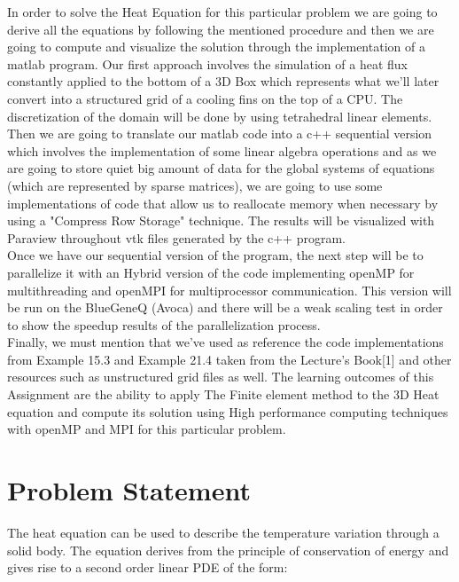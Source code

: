 \documentclass[12pt]{article}
\begin{document}
In order to solve the Heat Equation for this particular problem we are going to derive all the equations by following the mentioned procedure and then we are going to compute and visualize the solution through the implementation of a matlab program. Our first approach involves the simulation of a heat flux constantly applied to the bottom of a 3D Box which represents what we'll later convert into a structured grid of a cooling fins on the top of a CPU. The discretization of the domain will be done by using tetrahedral linear elements. \\

Then we are going to translate our matlab code into a c++ sequential version which involves the implementation of some linear algebra operations and as we are going to store quiet big amount of data for the global systems of equations (which are represented by sparse matrices), we are going to use some implementations of code that allow us to reallocate memory when necessary by using a "Compress Row Storage" technique. The results will be visualized with Paraview throughout vtk files generated by the c++ program.\\

Once we have our sequential version of the program, the next step will be to parallelize it with an Hybrid version of the code implementing openMP for multithreading and openMPI for multiprocessor communication. This version will be run on the BlueGeneQ (Avoca) and there will be a weak scaling test in order to show the speedup results of the parallelization process.\\

Finally, we must mention that we've used as reference the code implementations from Example 15.3 and Example 21.4 taken from the Lecture's Book[1] and other resources such as unstructured grid files as well. The learning outcomes of this Assignment are the ability to apply The Finite element method to the 3D Heat equation and compute its solution using High performance computing techniques with openMP and MPI for this particular problem.\\ 
	
	\section{Problem Statement}
	
The heat equation can be used to describe the temperature variation through a
solid body. The equation derives from the principle of conservation of energy
and gives rise to a second order linear PDE of the form:
	
\end{document}
